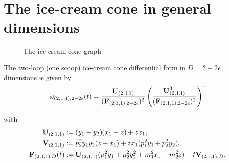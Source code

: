 \documentclass[a4paper,12pt]{article}
\numberwithin{equation}{section}
\numberwithin{figure}{subsection}
\theoremstyle{plain}
\theoremstyle{plain}
\theoremstyle{definition}
\theoremstyle{plain}
\theoremstyle{remark}
\theoremstyle{plain}
\begin{document}
     
\section{The ice-cream cone in general dimensions}\label{sec:ice-cream}

\begin{figure}[h]
  \centering
{}
\caption{The ice cream cone graph}\label{fig:icecream}
\end{figure}

The two-loop (one scoop) ice-cream cone  differential form in
$D=2-2\epsilon$ dimensions is given by
\begin{equation}
  \omega_{(2,1,1),  2-2\epsilon}(t)= {\textbf{U}_{(2,1,1)}\over
    (\textbf{F}_{(2,1,1);2-2\epsilon})^2} \left(\textbf{U}_{(2,1,1)}^3\over  (\textbf{F}_{(2,1,1);2-2\epsilon})^2\right)^{\epsilon}
\end{equation}

with
\begin{align}
  \textbf{U}_{(2,1,1)}&:=(y_1+y_2)(x_1+z)+zx_1,\cr
                        \textbf{V}_{(2,1,1)}&:=p_2^2y_1y_2(z+x_1)+zx_1(p_1^2y_1+p_2^2y_2),\\
\nonumber  \textbf{F}_{(2,1,1);D}(t)&:=\textbf{U}_{(2,1,1)}
                             (\mu_1^2y_1+\mu_2^2y_2^2+m_1^2x_1+m_2^2z)-t \textbf{V}_{(2,1,1);D}.
\end{align}
\end{document}
